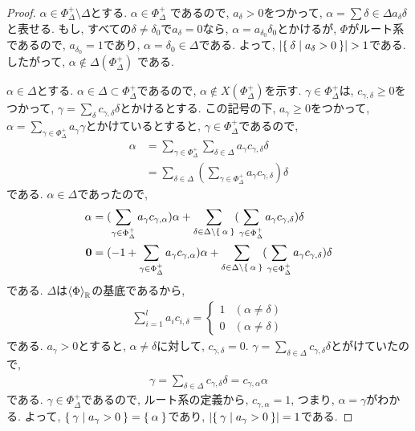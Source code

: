 \begin{proof}
  $\alpha \in \Phi_\Delta^+\setminus\Delta$とする.
  $\alpha\in \Phi_\Delta^+$
  であるので,
  $a_\delta > 0$をつかって,
  $\alpha=\sum{\delta\in\Delta}a_\delta \delta$と表せる.
  もし, すべての$\delta\neq\delta_0$で$a_\delta=0$なら,
  $\alpha=a_{\delta_0} \delta_0$とかけるが,
  $\Phi$がルート系であるので, $a_{\delta_0}=1$であり,
  $\alpha=\delta_0\in\Delta$である.
  よって, $\numof{\Set{\delta|a_\delta>0}}>1$である.
  したがって, $\alpha\not\in \Delta(\Phi_\Delta^+)$
  である.


  $\alpha\in\Delta$とする.
  $\alpha\in\Delta \subset \Phi_\Delta^+$であるので,
  $\alpha\not\in X(\Phi_\Delta^+)$を示す.
  $\gamma\in\Phi_\Delta^+$は,
  $c_{\gamma,\delta}\geq 0$をつかって,
  $\gamma=\sum_{\delta}c_{\gamma,\delta}\delta$とかけるとする.
  この記号の下,
  $a_\gamma\geq 0$をつかって,
  $\alpha=\sum_{\gamma\in\Phi_\Delta^+}a_\gamma\gamma$とかけているとすると,
  $\gamma\in \Phi_\Delta^+$であるので,
  \begin{align*}
    \alpha
    &=\sum_{\gamma\in\Phi_\Delta^+}\sum_{\delta\in\Delta}a_\gamma c_{\gamma,\delta}\delta\\
    &=\sum_{\delta\in\Delta}(\sum_{\gamma\in\Phi_\Delta^+}a_\gamma c_{\gamma,\delta})\delta
  \end{align*}
  である. $\alpha\in\Delta$であったので,
  \begin{align*}
    \alpha
    &=
    (\sum_{\gamma\in\Phi_\Delta^+}a_\gamma c_{\gamma,\alpha})\alpha
    +\sum_{\delta\in\Delta\setminus\Set{\alpha}}(\sum_{\gamma\in\Phi_\Delta^+}a_\gamma c_{\gamma,\delta})\delta\\
    \boldsymbol{0}
    &=
    (-1+\sum_{\gamma\in\Phi_\Delta^+}a_\gamma c_{\gamma,\alpha})\alpha
    +\sum_{\delta\in\Delta\setminus\Set{\alpha}}(\sum_{\gamma\in\Phi_\Delta^+}a_\gamma c_{\gamma,\delta})\delta
  \end{align*}
  である. 
  $\Delta$は$\Braket{\Phi}_{\mathbb{R}}$の基底であるから,　
  \begin{align*}
    \sum_{i=1}^la_i c_{i,\delta}=
    \begin{cases}
      1 &  (\alpha\neq\delta)\\
      0 & (\alpha\neq\delta)
    \end{cases}
  \end{align*}
  である.
  $a_\gamma>0$とすると,
  $\alpha\neq\delta$に対して, $c_{\gamma,\delta}=0$.
  $\gamma=\sum_{\delta\in\Delta}c_{\gamma,\delta}\delta$とがけていたので,
  \begin{align*}
    \gamma=\sum_{\delta\in\Delta}c_{\gamma,\delta}\delta=c_{\gamma,\alpha}\alpha
  \end{align*}
  である.
  $\gamma\in\Phi_\Delta^+$であるので, ルート系の定義から,
  $c_{\gamma,\alpha}=1$, つまり, $\alpha=\gamma$がわかる.
  よって, $\Set{\gamma|a_\gamma>0}=\Set{\alpha}$であり,
  $\left|\Set{\gamma|a_\gamma>0}\right|=1$である.

\end{proof}

